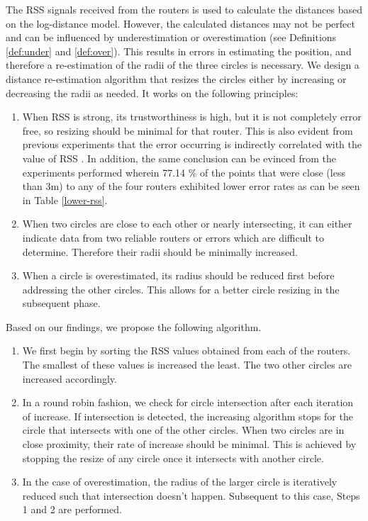 \documentclass[twocolumn]{svjour3}
\begin{document}
The RSS signals received from the routers is used to calculate the distances based on the log-distance model. However, the calculated distances may not be perfect and can be influenced by underestimation or overestimation (see Definitions \ref{def:under} and \ref{def:over}). This results in errors in estimating the position, and therefore a re-estimation of the radii of the three circles is necessary. We design a distance re-estimation algorithm that resizes the circles either by increasing or decreasing the radii as needed. It works on the following principles: 

\begin{enumerate}
\item When RSS is strong, its trustworthiness is high, but it is not completely error free, so resizing should be minimal for that router. This is also evident from previous experiments that the error occurring is indirectly correlated with the value of RSS \citep*{chandrasekaran2015inplace}. In addition, the same conclusion can be evinced from the experiments performed wherein 77.14 \% of the points that were close (less than 3m) to any of the four routers exhibited lower error rates as can be seen in Table \ref{lower-rss}.
\item When two circles are close to each other or nearly intersecting, it can either indicate data from two reliable routers or errors which are difficult to determine. Therefore their radii should be minimally increased. 
\item When a circle is overestimated, its radius should be reduced first before addressing the other circles. This allows for a better circle resizing in the subsequent phase. 
\end{enumerate} 

Based on our findings, we propose the following algorithm.

\begin{enumerate}
    \item We first begin by sorting the RSS values obtained from each of the routers. The smallest of these values is increased the least. The two other circles are increased accordingly. 
    \item In a round robin fashion, we check for circle intersection after each iteration of increase. If intersection is detected, the increasing algorithm stops for the circle that intersects with one of the other circles. When two circles are in close proximity, their rate of increase should be minimal. This is achieved by stopping the resize of any circle once it intersects with another circle. 
    \item In the case of overestimation, the radius of the larger circle is iteratively reduced such that intersection doesn't happen. Subsequent to this case, Steps 1 and 2 are performed.
\end{enumerate}
\end{document}
